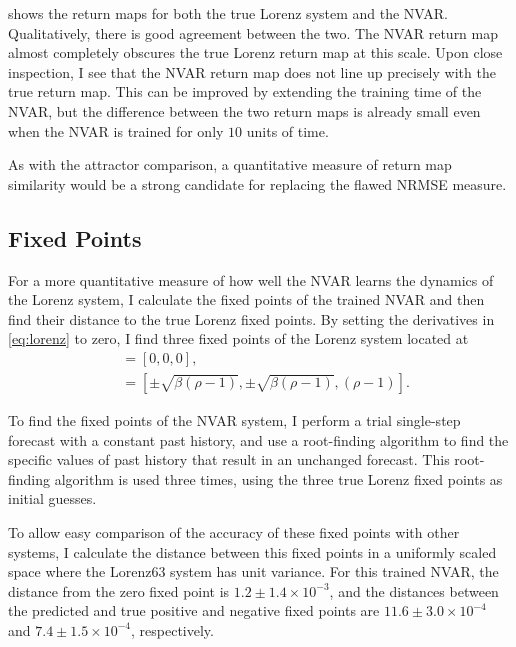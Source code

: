  shows the return maps for both the true
Lorenz system and the NVAR. Qualitatively, there is good agreement
between the two. The NVAR return map almost completely obscures the
true Lorenz return map at this scale. Upon close inspection, I see
that the NVAR return map does not line up precisely with the true
return map. This can be improved by extending the training time of the
NVAR, but the difference between the two return maps is already small
even when the NVAR is trained for only $10$ units of time.

As with the attractor comparison, a quantitative measure of return map
similarity would be a strong candidate for replacing the flawed NRMSE
measure.

\subsection{Fixed Points}

For a more quantitative measure of how well the NVAR learns the
dynamics of the Lorenz system, I calculate the fixed points of the
trained NVAR and then find their distance to the true Lorenz fixed
points. By setting the derivatives in \cref{eq:lorenz} to zero, I
find three fixed points of the Lorenz system located at
\begin{align}
  [x, y, z] &= [0, 0, 0], \\
            &= [\pm \sqrt{\beta(\rho - 1)}, \pm \sqrt{\beta(\rho - 1)}, (\rho - 1)].
\end{align}

To find the fixed points of the NVAR system, I perform a trial
single-step forecast with a constant past history, and use a
root-finding algorithm to find the specific values of past history
that result in an unchanged forecast. This root-finding algorithm is
used three times, using the three true Lorenz fixed points as initial
guesses.

To allow easy comparison of the accuracy of these fixed points with
other systems, I calculate the distance between this fixed points in
a uniformly scaled space where the Lorenz63 system has unit
variance. For this trained NVAR, the distance from the zero fixed point
is $1.2\pm1.4\times10^{-3}$, and the distances between the predicted
and true positive and negative fixed points are
$11.6\pm3.0\times10^{-4}$ and $7.4\pm1.5\times10^{-4}$, respectively.

